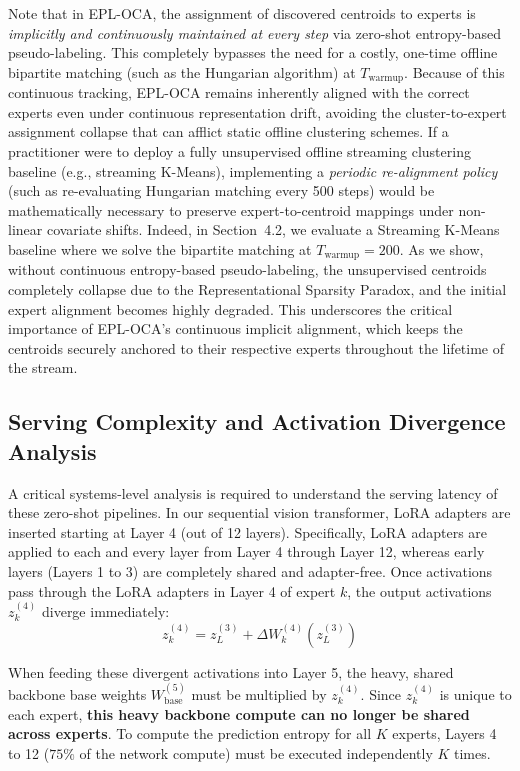 Note that in EPL-OCA, the assignment of discovered centroids to experts is \emph{implicitly and continuously maintained at every step} via zero-shot entropy-based pseudo-labeling. This completely bypasses the need for a costly, one-time offline bipartite matching (such as the Hungarian algorithm) at $T_{\text{warmup}}$. Because of this continuous tracking, EPL-OCA remains inherently aligned with the correct experts even under continuous representation drift, avoiding the cluster-to-expert assignment collapse that can afflict static offline clustering schemes. If a practitioner were to deploy a fully unsupervised offline streaming clustering baseline (e.g., streaming K-Means), implementing a \emph{periodic re-alignment policy} (such as re-evaluating Hungarian matching every 500 steps) would be mathematically necessary to preserve expert-to-centroid mappings under non-linear covariate shifts. Indeed, in Section~4.2, we evaluate a Streaming K-Means baseline where we solve the bipartite matching at $T_{\text{warmup}} = 200$. As we show, without continuous entropy-based pseudo-labeling, the unsupervised centroids completely collapse due to the Representational Sparsity Paradox, and the initial expert alignment becomes highly degraded. This underscores the critical importance of EPL-OCA's continuous implicit alignment, which keeps the centroids securely anchored to their respective experts throughout the lifetime of the stream.

\subsection{Serving Complexity and Activation Divergence Analysis}
A critical systems-level analysis is required to understand the serving latency of these zero-shot pipelines. In our sequential vision transformer, LoRA adapters are inserted starting at Layer 4 (out of 12 layers). Specifically, LoRA adapters are applied to each and every layer from Layer 4 through Layer 12, whereas early layers (Layers 1 to 3) are completely shared and adapter-free. Once activations pass through the LoRA adapters in Layer 4 of expert $k$, the output activations $z_k^{(4)}$ diverge immediately:
\begin{equation}
z_k^{(4)} = z_L^{(3)} + \Delta W_k^{(4)}(z_L^{(3)})
\label{eq:activation_divergence}
\end{equation}

When feeding these divergent activations into Layer 5, the heavy, shared backbone base weights $W_{\text{base}}^{(5)}$ must be multiplied by $z_k^{(4)}$. Since $z_k^{(4)}$ is unique to each expert, \textbf{this heavy backbone compute can no longer be shared across experts}. To compute the prediction entropy for all $K$ experts, Layers 4 to 12 ($75\%$ of the network compute) must be executed independently $K$ times. 


